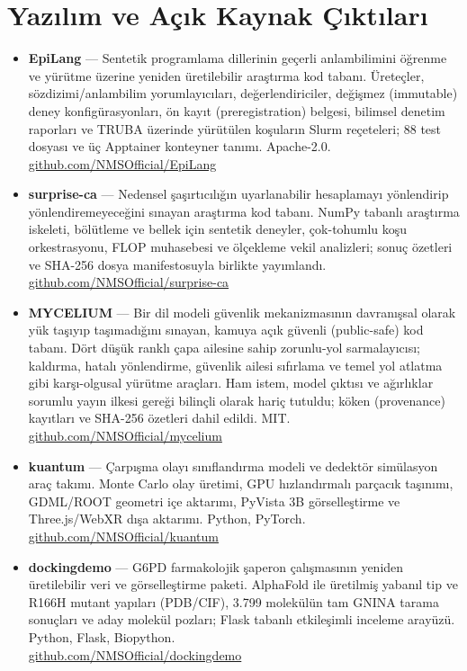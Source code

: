 \documentclass[11pt,a4paper]{article}
\begin{document}
\section*{Yazılım ve Açık Kaynak Çıktıları}
\begin{itemize}
    \item \textbf{EpiLang} --- Sentetik programlama dillerinin geçerli anlambilimini öğrenme ve yürütme üzerine yeniden üretilebilir araştırma kod tabanı. Üreteçler, sözdizimi/anlambilim yorumlayıcıları, değerlendiriciler, değişmez (immutable) deney konfigürasyonları, ön kayıt (preregistration) belgesi, bilimsel denetim raporları ve TRUBA üzerinde yürütülen koşuların Slurm reçeteleri; 88 test dosyası ve üç Apptainer konteyner tanımı. Apache-2.0. \\
    \href{https://github.com/NMSOfficial/EpiLang}{github.com/NMSOfficial/EpiLang}
    \item \textbf{surprise-ca} --- Nedensel şaşırtıcılığın uyarlanabilir hesaplamayı yönlendirip yönlendiremeyeceğini sınayan araştırma kod tabanı. NumPy tabanlı araştırma iskeleti, bölütleme ve bellek için sentetik deneyler, çok-tohumlu koşu orkestrasyonu, FLOP muhasebesi ve ölçekleme vekil analizleri; sonuç özetleri ve SHA-256 dosya manifestosuyla birlikte yayımlandı. \\
    \href{https://github.com/NMSOfficial/surprise-ca}{github.com/NMSOfficial/surprise-ca}
    \item \textbf{MYCELIUM} --- Bir dil modeli güvenlik mekanizmasının davranışsal olarak yük taşıyıp taşımadığını sınayan, kamuya açık güvenli (public-safe) kod tabanı. Dört düşük ranklı çapa ailesine sahip zorunlu-yol sarmalayıcısı; kaldırma, hatalı yönlendirme, güvenlik ailesi sıfırlama ve temel yol atlatma gibi karşı-olgusal yürütme araçları. Ham istem, model çıktısı ve ağırlıklar sorumlu yayın ilkesi gereği bilinçli olarak hariç tutuldu; köken (provenance) kayıtları ve SHA-256 özetleri dahil edildi. MIT. \\
    \href{https://github.com/NMSOfficial/mycelium}{github.com/NMSOfficial/mycelium}
    \item \textbf{kuantum} --- Çarpışma olayı sınıflandırma modeli ve dedektör simülasyon araç takımı. Monte Carlo olay üretimi, GPU hızlandırmalı parçacık taşınımı, GDML/ROOT geometri içe aktarımı, PyVista 3B görselleştirme ve Three.js/WebXR dışa aktarımı. Python, PyTorch. \\
    \href{https://github.com/NMSOfficial/kuantum}{github.com/NMSOfficial/kuantum}
    \item \textbf{dockingdemo} --- G6PD farmakolojik şaperon çalışmasının yeniden üretilebilir veri ve görselleştirme paketi. AlphaFold ile üretilmiş yabanıl tip ve R166H mutant yapıları (PDB/CIF), 3.799 molekülün tam GNINA tarama sonuçları ve aday molekül pozları; Flask tabanlı etkileşimli inceleme arayüzü. Python, Flask, Biopython. \\
    \href{https://github.com/NMSOfficial/dockingdemo}{github.com/NMSOfficial/dockingdemo}
\end{itemize}
\end{document}
